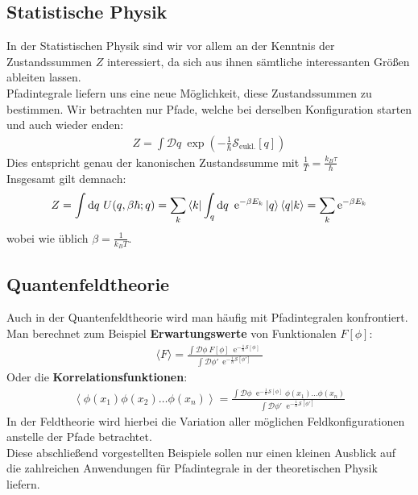 \subsection{Statistische Physik}
In der Statistischen Physik sind wir vor allem an der Kenntnis der Zustandssummen $Z$ interessiert, da sich aus ihnen sämtliche interessanten Größen ableiten lassen. \\
Pfadintegrale liefern uns  eine neue Möglichkeit, diese Zustandssummen zu bestimmen. 
Wir betrachten nur Pfade, welche bei derselben Konfiguration starten und auch wieder enden:
\begin{align}
		Z = \int \mathcal{D}q \ \exp\left(-\frac{1}{\hbar}\mathcal{S}_{\text{eukl.}}[q]\right)
\end{align}
Dies entspricht genau der kanonischen Zustandssumme mit $\frac{1}{T} = \frac{k_B\tau}{\hbar}$ \\
Insgesamt gilt demnach:
\begin{align}
		Z = \int \dd q \ U(q,\beta\hbar;q) = \sum_k\bra{k} \int_q \dd q \ \operatorname{e}^{-\beta E_k}\ket{q}\braket{q}{k} = \sum_k \operatorname{e}^{-\beta E_k}
\end{align}
wobei wie üblich $\beta = \frac{1}{k_B T}$.
\subsection{Quantenfeldtheorie}
Auch in der Quantenfeldtheorie wird man häufig mit Pfadintegralen konfrontiert. Man berechnet zum Beispiel \textbf{Erwartungswerte} von Funktionalen $F[\phi]$:
\begin{align}
	\langle F \rangle = \frac{\int\mathcal{D}\phi \ F[\phi]\ \operatorname{e}^{-\frac{1}{\hbar}\mathcal{S}[\phi]}}{\int\mathcal{D}\phi' \ \operatorname{e}^{-\frac{1}{\hbar}\mathcal{S}[\phi']}}
\end{align}
Oder die \textbf{Korrelationsfunktionen}:
\begin{align}
\left\langle \phi(x_1) \phi(x_2) \ldots \phi(x_n)\right\rangle
=\frac{\int \mathcal D \phi \; \operatorname{e}^{-\frac{1}{\hbar}\mathcal{S}[\phi]}\phi(x_1)\ldots \phi(x_n)}{\int \mathcal D \phi' \; \operatorname{e}^{-\frac{1}{\hbar}\mathcal{S}[\phi']}}
\end{align}
In der Feldtheorie  wird hierbei die Variation aller möglichen Feldkonfigurationen anstelle der Pfade betrachtet. \\

Diese abschließend vorgestellten Beispiele sollen nur einen kleinen Ausblick auf die zahlreichen Anwendungen für Pfadintegrale in der theoretischen Physik liefern. 